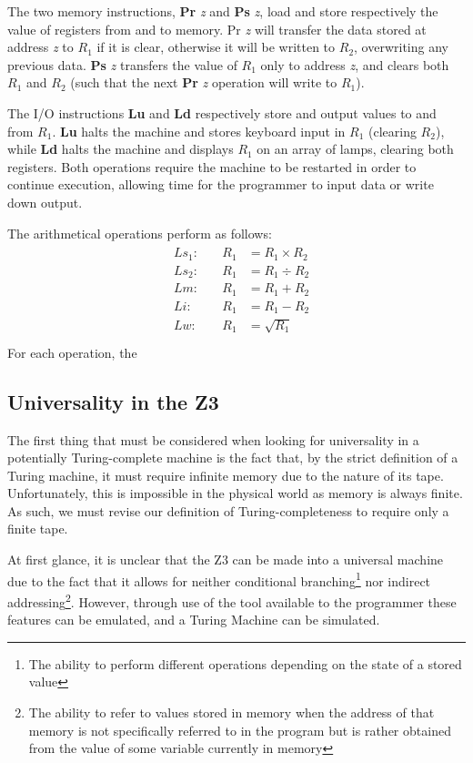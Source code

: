 \documentclass[Master.tex]{subfiles}
\begin{document}
The two memory instructions, \textbf{Pr} \textit{z} and \textbf{Ps} \textit{z}, load and store respectively the value of registers from and to memory. Pr \textit{z} will transfer the data stored at address \textit{z} to $R_1$ if it is clear, otherwise it will be written to $R_2$, overwriting any previous data. \textbf{Ps} \textit{z} transfers the value of $R_1$ only to address \textit{z}, and clears both $R_1$ and $R_2$ (such that the next \textbf{Pr} \textit{z} operation will write to $R_1$). 

The I/O instructions \textbf{Lu} and \textbf{Ld} respectively store and output values to and from $R_1$. \textbf{Lu} halts the machine and stores keyboard input in $R_1$ (clearing $R_2$), while \textbf{Ld} halts the machine and displays $R_1$ on an array of lamps, clearing both registers. Both operations require the machine to be restarted in order to continue execution, allowing time for the programmer to input data or write down output.

The arithmetical operations perform as follows:
\begin{gather*}
\begin{aligned}
&Ls_1:\quad	&R_1 &= R_1 \times R_2 \\
&Ls_2:\quad	&R_1 &= R_1 \div R_2 \\
&Lm:\quad	&R_1 &= R_1 + R_2 \\
&Li:\quad	&R_1 &= R_1 - R_2 \\
&Lw:\quad	&R_1 &= \sqrt{R_1} \\
\end{aligned}
\end{gather*}
For each operation, the 
\subsection{Universality in the Z3}

The first thing that must be considered when looking for universality in a potentially Turing-complete machine is the fact that, by the strict definition of a Turing machine, it must require infinite memory due to the nature of its tape. Unfortunately, this is impossible in the physical world as memory is always finite. As such, we must revise our definition of Turing-completeness to require only a finite tape.

At first glance, it is unclear that the Z3 can be made into a universal machine due to the fact that it allows for neither conditional branching\footnote{The ability to perform different operations depending on the state of a stored value} nor indirect addressing\footnote{The ability to refer to values stored in memory when the address of that memory is not specifically referred to in the program but is rather obtained from the value of some variable currently in memory}. However, through use of the tool available to the programmer these features can be emulated, and a Turing Machine can be simulated.
\end{document}
